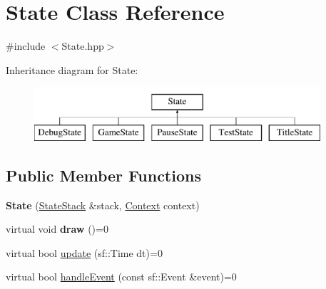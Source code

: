 \hypertarget{classState}{\section{\-State \-Class \-Reference}
\label{classState}
}


{\ttfamily \#include $<$\-State.\-hpp$>$}

\-Inheritance diagram for \-State\-:\begin{figure}[H]
\begin{center}
\leavevmode
\includegraphics[height=2.000000cm]{classState}
\end{center}
\end{figure}
\subsection*{\-Public \-Member \-Functions}
\begin{DoxyCompactItemize}
\item 
\hypertarget{classState_afede488ff3c1b264bbd07f8aeead84a7_afede488ff3c1b264bbd07f8aeead84a7}{{\bfseries \-State} (\hyperlink{classStateStack}{\-State\-Stack} \&stack, \hyperlink{classContext}{\-Context} context)}\label{classState_afede488ff3c1b264bbd07f8aeead84a7_afede488ff3c1b264bbd07f8aeead84a7}

\item 
\hypertarget{classState_ae261605bc40b7e3959ce5df5457e4942_ae261605bc40b7e3959ce5df5457e4942}{virtual void {\bfseries draw} ()=0}\label{classState_ae261605bc40b7e3959ce5df5457e4942_ae261605bc40b7e3959ce5df5457e4942}

\item 
virtual bool \hyperlink{classState_acd5926bc7a373edff9e57f3ffe94ca13_acd5926bc7a373edff9e57f3ffe94ca13}{update} (sf\-::\-Time dt)=0
\item 
virtual bool \hyperlink{classState_a19965f83460b248c42952aac8d001206_a19965f83460b248c42952aac8d001206}{handle\-Event} (const sf\-::\-Event \&event)=0
\end{DoxyCompactItemize}
